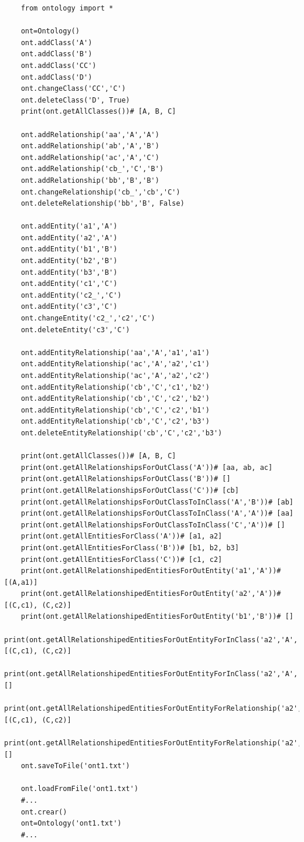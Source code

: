 \documentclass{article}
\begin{document}
	\normalsize
	\begin{verbatim}
	from ontology import *
	
	ont=Ontology()
	ont.addClass('A')
	ont.addClass('B')
	ont.addClass('CC')
	ont.addClass('D')
	ont.changeClass('CC','C')
	ont.deleteClass('D', True)
	print(ont.getAllClasses())# [A, B, C]
	
	ont.addRelationship('aa','A','A')
	ont.addRelationship('ab','A','B')
	ont.addRelationship('ac','A','C')
	ont.addRelationship('cb_','C','B')
	ont.addRelationship('bb','B','B')
	ont.changeRelationship('cb_','cb','C')
	ont.deleteRelationship('bb','B', False)
	
	ont.addEntity('a1','A')
	ont.addEntity('a2','A')
	ont.addEntity('b1','B')
	ont.addEntity('b2','B')
	ont.addEntity('b3','B')
	ont.addEntity('c1','C')
	ont.addEntity('c2_','C')
	ont.addEntity('c3','C')
	ont.changeEntity('c2_','c2','C')
	ont.deleteEntity('c3','C')
	
	ont.addEntityRelationship('aa','A','a1','a1')
	ont.addEntityRelationship('ac','A','a2','c1')
	ont.addEntityRelationship('ac','A','a2','c2')
	ont.addEntityRelationship('cb','C','c1','b2')
	ont.addEntityRelationship('cb','C','c2','b2')
	ont.addEntityRelationship('cb','C','c2','b1')
	ont.addEntityRelationship('cb','C','c2','b3')
	ont.deleteEntityRelationship('cb','C','c2','b3')
	
	print(ont.getAllClasses())# [A, B, C]
	print(ont.getAllRelationshipsForOutClass('A'))# [aa, ab, ac]
	print(ont.getAllRelationshipsForOutClass('B'))# []
	print(ont.getAllRelationshipsForOutClass('C'))# [cb]
	print(ont.getAllRelationshipsForOutClassToInClass('A','B'))# [ab]
	print(ont.getAllRelationshipsForOutClassToInClass('A','A'))# [aa]
	print(ont.getAllRelationshipsForOutClassToInClass('C','A'))# []
	print(ont.getAllEntitiesForClass('A'))# [a1, a2]
	print(ont.getAllEntitiesForClass('B'))# [b1, b2, b3]
	print(ont.getAllEntitiesForClass('C'))# [c1, c2]
	print(ont.getAllRelationshipedEntitiesForOutEntity('a1','A'))# [(A,a1)]
	print(ont.getAllRelationshipedEntitiesForOutEntity('a2','A'))# [(C,c1), (C,c2)]
	print(ont.getAllRelationshipedEntitiesForOutEntity('b1','B'))# []
	print(ont.getAllRelationshipedEntitiesForOutEntityForInClass('a2','A','C'))# [(C,c1), (C,c2)]
	print(ont.getAllRelationshipedEntitiesForOutEntityForInClass('a2','A','B'))# []
	print(ont.getAllRelationshipedEntitiesForOutEntityForRelationship('a2','A','ac'))# [(C,c1), (C,c2)]
	print(ont.getAllRelationshipedEntitiesForOutEntityForRelationship('a2','A','ab'))# []
	ont.saveToFile('ont1.txt')
	
	ont.loadFromFile('ont1.txt')
	#...
	ont.crear()
	ont=Ontology('ont1.txt')
	#...
	\end{verbatim}
	\large
\end{document}

